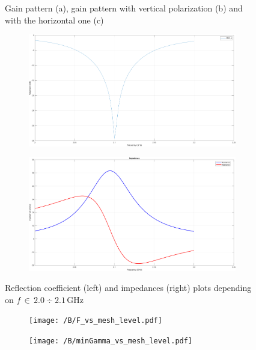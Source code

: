 \documentclass{ieeeojies}
\begin{document}
\begin{center}
\begin{figure}[t]
\begin{subfigure}[t]{0.32\textwidth}
						\subcaption{}
	\end{subfigure}
		\caption{ Gain pattern (a), gain pattern with vertical polarization (b) and with the horizontal one (c)}
	\end{figure}
\end{center}


\begin{center}
	\begin{figure}[t]
			\begin{subfigure}[t]{0.5\textwidth}
		\includegraphics[width = \linewidth]{gamma.png}
								\subcaption{}
	\end{subfigure}
	\begin{subfigure}[t]{0.5\textwidth}
		\includegraphics[width = \linewidth]{impedances.png}
						\subcaption{}		
	\end{subfigure}
		\caption{ Reflection coefficient (left) and impedances (right) plots depending on $f\,\in\,2.0\div 2.1\,\text{GHz}$}
	\end{figure}
\end{center}
\begin{center}
	\begin{figure}[t]
		\begin{subfigure}[t]{0.5\textwidth}
			\texttt{[image: /B/F\_vs\_mesh\_level.pdf]}
			\subcaption{}
		\end{subfigure}
		\begin{subfigure}[t]{0.5\textwidth}
			\texttt{[image: /B/minGamma\_vs\_mesh\_level.pdf]}
			\subcaption{}		
		\end{subfigure}
	
	\end{figure}
\end{center}
\end{document}
